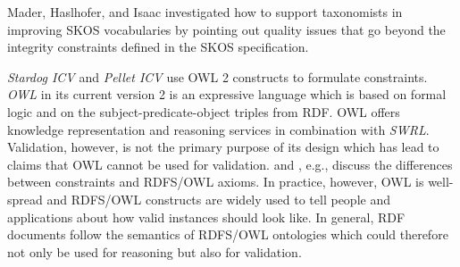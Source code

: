 \documentclass[conference]{IEEEtran}
\begin{document}
Mader, Haslhofer, and Isaac \cite{MaderHaslhoferIsaac2012} investigated how to support
taxonomists in improving SKOS vocabularies by pointing out quality
issues that go beyond the integrity constraints defined in the SKOS specification.
 
\emph{Stardog ICV} and \emph{Pellet ICV} use OWL 2 constructs to formulate constraints. \emph{OWL} in its current version 2 is an expressive language which is based on formal logic and on the subject-predicate-object triples from RDF. OWL offers knowledge representation and reasoning services in combination with \emph{SWRL}. Validation, however, is not the primary purpose of its design which has lead to claims that OWL cannot be used for validation. \cite{Motik-2007} and \cite{Motik-2009}, e.g., discuss the differences between constraints and RDFS/OWL axioms. In practice, however, OWL is well-spread and RDFS/OWL constructs are widely used to tell people and applications about how valid instances should look like. In general, RDF documents follow the semantics of RDFS/OWL ontologies which could therefore not only be used for reasoning but also for validation. 
\end{document}
